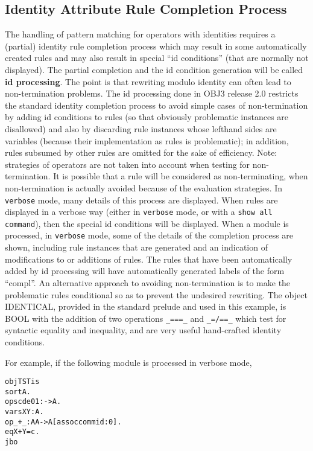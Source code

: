 \subsection{Identity Attribute Rule Completion Process}

The handling of pattern matching for operators with identities
requires a (partial) identity rule completion process which may result
in some automatically created rules and may also result in special
``id conditions'' (that are normally not displayed).  The partial
completion and the id condition generation will be called {\bf id
  processing}.  The point is that rewriting modulo identity can often
lead to non-termination problems.  The id processing done in OBJ3
release 2.0 restricts the standard identity completion process to
avoid simple cases of non-termination by adding id conditions to rules
(so that obviously problematic instances are disallowed) and also by
discarding rule instances whose lefthand sides are variables (because
their implementation as rules is problematic); in addition, rules
subsumed by other rules are omitted for the sake of efficiency.  Note:
strategies of operators are not taken into account when testing for
non-termination.  It is possible that a rule will be considered as
non-terminating, when non-termination is actually avoided because of
the evaluation strategies.  In {\tt verbose} mode, many details of
this process are displayed.  When rules are displayed in a verbose way
(either in {\tt verbose} mode, or with a {\tt show all command}), then
the special id conditions will be displayed.  When a module is
processed, in {\tt verbose} mode, some of the details of the
completion process are shown, including rule instances that are
generated and an indication of modifications to or additions of rules.
The rules that have been automatically added by id processing will
have automatically generated labels of the form ``compl''.  An
alternative approach to avoiding non-termination is to make the
problematic rules conditional so as to prevent the undesired
rewriting.  The object IDENTICAL, provided in the standard prelude and
used in this example, is BOOL with the addition of two operations
\verb|_===_| and \verb|_=/==_| which test for syntactic equality and
inequality, and are very useful hand-crafted identity conditions.

For example, if the following module is processed in verbose mode,

\begin{alltt}
    obj TST is
      sort A .
      ops c d e 0 1 : -> A .
      vars X Y : A .
      op _+_ : A A -> A [assoc comm id: 0] .
      eq X + Y = c .
    jbo
\end{alltt}


